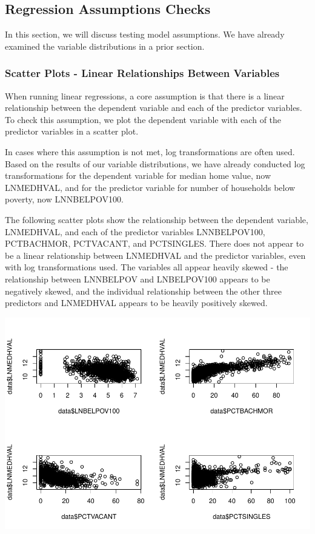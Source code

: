 \documentclass[
]{article}
\begin{document}
\hypertarget{regression-assumptions-checks}{%
\subsection{Regression Assumptions
Checks}\label{regression-assumptions-checks}}

In this section, we will discuss testing model assumptions. We have
already examined the variable distributions in a prior section.

\hypertarget{scatter-plots---linear-relationships-between-variables}{%
\subsubsection{Scatter Plots - Linear Relationships Between
Variables}\label{scatter-plots---linear-relationships-between-variables}}

When running linear regressions, a core assumption is that there is a
linear relationship between the dependent variable and each of the
predictor variables. To check this assumption, we plot the dependent
variable with each of the predictor variables in a scatter plot.

In cases where this assumption is not met, log transformations are often
used. Based on the results of our variable distributions, we have
already conducted log transformations for the dependent variable for
median home value, now LNMEDHVAL, and for the predictor variable for
number of households below poverty, now LNNBELPOV100.

The following scatter plots show the relationship between the dependent
variable, LNMEDHVAL, and each of the predictor variables LNNBELPOV100,
PCTBACHMOR, PCTVACANT, and PCTSINGLES. There does not appear to be a
linear relationship between LNMEDHVAL and the predictor variables, even
with log transformations used. The variables all appear heavily skewed -
the relationship between LNNBELPOV and LNBELPOV100 appears to be
negatively skewed, and the individual relationship between the other
three predictors and LNMEDHVAL appears to be heavily positively skewed.

\includegraphics{HW1-Regression_files/figure-latex/scatter-1.pdf}
\end{document}
